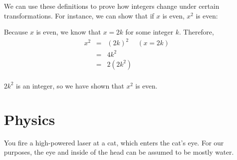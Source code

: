 \documentclass[11pt]{exam}
\def\QED{\ensuremath{{\square}}}
\def\markatright#1{\leavevmode\unskip\nobreak\quad\hspace*{\fill}{#1}}
\newenvironment{proof}
  {\begin{trivlist}\item[\hskip\labelsep{\bf Proof.}]}
  {\markatright{\QED}\end{trivlist}}
\begin{document}
\begin{questions}
We can use these definitions to prove how integers change under certain
transformations. For instance, we can show that if $x$ is even, $x^2$ is even:

\begin{proof}
Because $x$ is even, we know that $x = 2k$ for some integer $k$. Therefore,
\[\begin{array}{rclr}
x^2 &=& (2k)^2 & (x = 2k) \\
&=& 4k^2 & \\
&=& 2(2k^2) & \\
\end{array}\]

$2k^2$ is an integer, so we have shown that $x^2$ is even.
\end{proof}









\newpage
\section{Physics}
\setcounter{question}{0}

\question You fire a high-powered laser at a cat, which enters the cat's
eye. For our purposes, the eye and inside of the head can be assumed to be mostly
water.



\end{questions}
\end{document}
